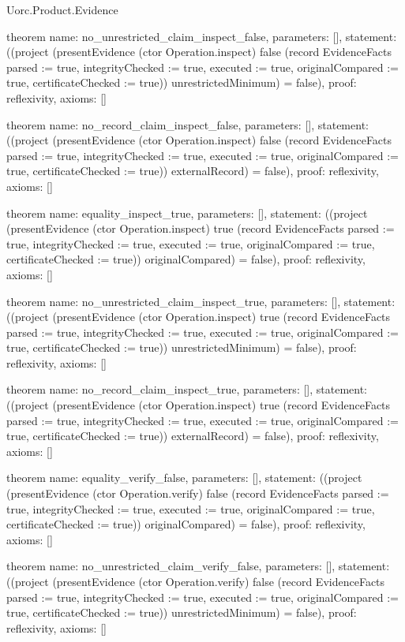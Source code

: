 \begin{lexlean}{Uorc.Product.Evidence}
\begin{semanticmodule}
theorem{
  name: no_unrestricted_claim_inspect_false,
  parameters: [],
  statement: ((project (presentEvidence (ctor Operation.inspect) false (record EvidenceFacts {parsed := true, integrityChecked := true, executed := true, originalCompared := true, certificateChecked := true})) unrestrictedMinimum) = false),
  proof: reflexivity{},
  axioms: []
}

theorem{
  name: no_record_claim_inspect_false,
  parameters: [],
  statement: ((project (presentEvidence (ctor Operation.inspect) false (record EvidenceFacts {parsed := true, integrityChecked := true, executed := true, originalCompared := true, certificateChecked := true})) externalRecord) = false),
  proof: reflexivity{},
  axioms: []
}

theorem{
  name: equality_inspect_true,
  parameters: [],
  statement: ((project (presentEvidence (ctor Operation.inspect) true (record EvidenceFacts {parsed := true, integrityChecked := true, executed := true, originalCompared := true, certificateChecked := true})) originalCompared) = false),
  proof: reflexivity{},
  axioms: []
}

theorem{
  name: no_unrestricted_claim_inspect_true,
  parameters: [],
  statement: ((project (presentEvidence (ctor Operation.inspect) true (record EvidenceFacts {parsed := true, integrityChecked := true, executed := true, originalCompared := true, certificateChecked := true})) unrestrictedMinimum) = false),
  proof: reflexivity{},
  axioms: []
}

theorem{
  name: no_record_claim_inspect_true,
  parameters: [],
  statement: ((project (presentEvidence (ctor Operation.inspect) true (record EvidenceFacts {parsed := true, integrityChecked := true, executed := true, originalCompared := true, certificateChecked := true})) externalRecord) = false),
  proof: reflexivity{},
  axioms: []
}

theorem{
  name: equality_verify_false,
  parameters: [],
  statement: ((project (presentEvidence (ctor Operation.verify) false (record EvidenceFacts {parsed := true, integrityChecked := true, executed := true, originalCompared := true, certificateChecked := true})) originalCompared) = false),
  proof: reflexivity{},
  axioms: []
}

theorem{
  name: no_unrestricted_claim_verify_false,
  parameters: [],
  statement: ((project (presentEvidence (ctor Operation.verify) false (record EvidenceFacts {parsed := true, integrityChecked := true, executed := true, originalCompared := true, certificateChecked := true})) unrestrictedMinimum) = false),
  proof: reflexivity{},
  axioms: []
}


\end{semanticmodule}
\end{lexlean}
